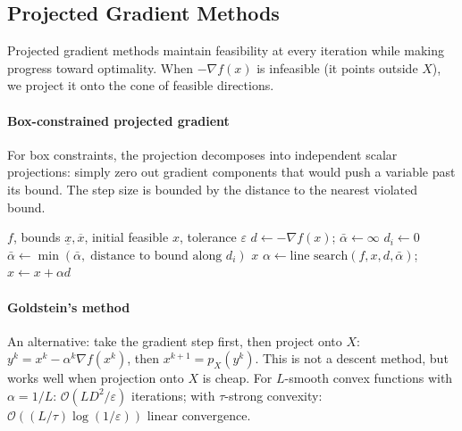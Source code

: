 \subsection{Projected Gradient Methods}\label{ssec:projected-gradient}

Projected gradient methods maintain feasibility at every iteration while making progress toward optimality.
When $-\nabla f(x)$ is infeasible (it points outside $X$), we project it onto the cone of feasible directions.

\paragraph{Box-constrained projected gradient}

For box constraints, the projection decomposes into independent scalar projections: simply zero out gradient components that would push a variable past its bound.
The step size is bounded by the distance to the nearest violated bound.

\begin{algorithm}
	\caption{Box-Constrained Projected Gradient (BCPGM)}
	\label{alg:BCPGM}
	\begin{algorithmic}[1]
		\Require $f$, bounds $\underline{x}, \overline{x}$, initial feasible $x$, tolerance $\varepsilon$
				\State $d \gets -\nabla f(x)$;\; $\bar{\alpha} \gets \infty$
						\State $d_i \gets 0$ 
						\State $\bar{\alpha} \gets \min(\bar{\alpha},\; \text{distance to bound along } d_i)$
					\EndIf
				\EndFor
				 \Return $x$ \EndIf
				\State $\alpha \gets \text{line search}(f, x, d, \bar{\alpha})$;\; $x \gets x + \alpha d$
			\EndWhile
		\EndProcedure
	\end{algorithmic}
\end{algorithm}

\paragraph{Goldstein's method}

An alternative: take the gradient step first, then project onto $X$:
$y^k = x^k - \alpha^k \nabla f(x^k)$, then $x^{k+1} = p_X(y^k)$.
This is not a descent method, but works well when projection onto $X$ is cheap.
For $L$-smooth convex functions with $\alpha = 1/L$: $\mathcal{O}(LD^2/\varepsilon)$ iterations; with $\tau$-strong convexity: $\mathcal{O}((L/\tau)\log(1/\varepsilon))$ linear convergence.

